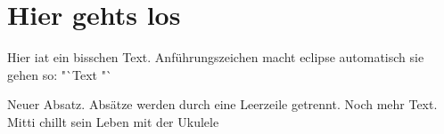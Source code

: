 \chapter{Hier gehts los}

Hier iat ein bisschen Text. 
Anführungszeichen macht eclipse automatisch sie gehen so: "`Text "`


Neuer Absatz. Absätze werden durch eine Leerzeile getrennt. Noch mehr Text. Mitti chillt sein Leben 
mit der Ukulele 


